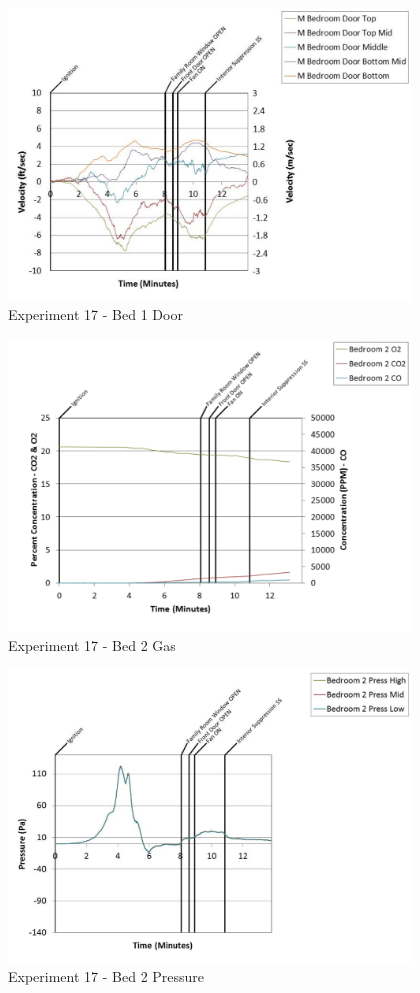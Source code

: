 \documentclass{article}
\begin{document}
\begin{appendices}
	\clearpage

	\begin{figure}[h!]
		\centering
		\includegraphics[height=3.05in]{0_Images/Results_Charts/Exp_17_Charts/Bed1Door.pdf}
		\caption{Experiment 17 - Bed 1 Door}
	\end{figure}
 

	\begin{figure}[h!]
		\centering
		\includegraphics[height=3.05in]{0_Images/Results_Charts/Exp_17_Charts/Bed2Gas.pdf}
		\caption{Experiment 17 - Bed 2 Gas}
	\end{figure}
 
	\clearpage

	\begin{figure}[h!]
		\centering
		\includegraphics[height=3.05in]{0_Images/Results_Charts/Exp_17_Charts/Bed2Pressure.pdf}
		\caption{Experiment 17 - Bed 2 Pressure}
	\end{figure}
 


\end{appendices}
\end{document}
